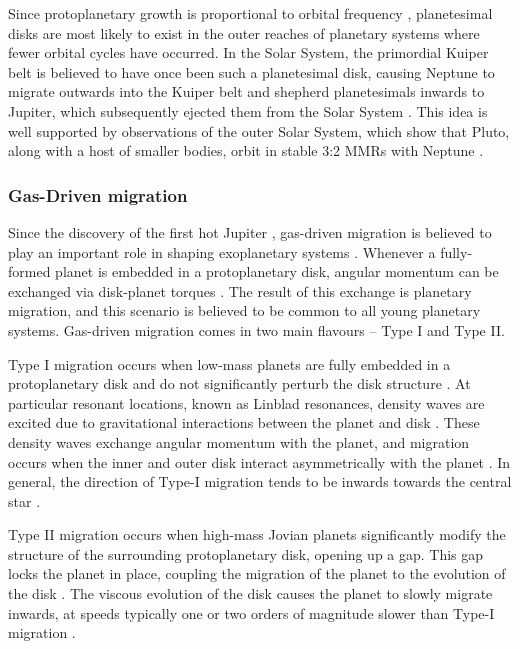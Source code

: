 Since protoplanetary growth is proportional to orbital frequency \citep[e.g.][]{Rafikov2003}, planetesimal disks are most likely to exist in the outer reaches of planetary systems where fewer orbital cycles have occurred. 
In the Solar System, the primordial Kuiper belt is believed to have once been such a planetesimal disk, causing Neptune to migrate outwards into the Kuiper belt and shepherd planetesimals inwards to Jupiter, which subsequently ejected them from the Solar System \citep{Fernandez1984}.
This idea is well supported by observations of the outer Solar System, which show that Pluto, along with a host of smaller bodies, orbit in stable 3:2 MMRs with Neptune \citep{Malhotra1993, Malhotra1995}.

\subsubsection{Gas-Driven migration}
Since the discovery of the first hot Jupiter \citep{Mayor1995}, gas-driven migration is believed to play an important role in shaping exoplanetary systems \citep{Lin1996}.
Whenever a fully-formed planet is embedded in a protoplanetary disk, angular momentum can be exchanged via disk-planet torques \citep{Goldreich1980}.
The result of this exchange is planetary migration, and this scenario is believed to be common to all young planetary systems. 
Gas-driven migration comes in two main flavours -- Type I and Type II. 

Type I migration occurs when low-mass planets are fully embedded in a protoplanetary disk and do not significantly perturb the disk structure \citep{Armitage2010}. 
At particular resonant locations, known as Linblad resonances, density waves are excited due to gravitational interactions between the planet and disk \citep{Goldreich1979}. 
These density waves exchange angular momentum with the planet, and migration occurs when the inner and outer disk interact asymmetrically with the planet \citep{Goldreich1979}.
In general, the direction of Type-I migration tends to be inwards towards the central star \citep{Ward1997}.

Type II migration occurs when high-mass Jovian planets significantly modify the structure of the surrounding protoplanetary disk, opening up a gap. 
This gap locks the planet in place, coupling the migration of the planet to the evolution of the disk \citep{Lin1986}.
The viscous evolution of the disk causes the planet to slowly migrate inwards, at speeds typically one or two orders of magnitude slower than Type-I migration \citep{Ward1997}.


